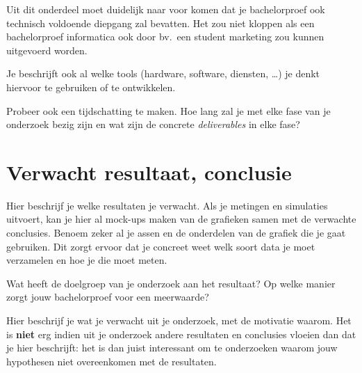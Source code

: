 Uit dit onderdeel moet duidelijk naar voor komen dat je bachelorproef ook technisch voldoen\-de diepgang zal bevatten. Het zou niet kloppen als een bachelorproef informatica ook door bv.\ een student marketing zou kunnen uitgevoerd worden.

Je beschrijft ook al welke tools (hardware, software, diensten, \ldots) je denkt hiervoor te gebruiken of te ontwikkelen.

Probeer ook een tijdschatting te maken. Hoe lang zal je met elke fase van je onderzoek bezig zijn en wat zijn de concrete \emph{deliverables} in elke fase?

\section{Verwacht resultaat, conclusie}
\label{sec:verwachte_resultaten}

Hier beschrijf je welke resultaten je verwacht. Als je metingen en simulaties uitvoert, kan je hier al mock-ups maken van de grafieken samen met de verwachte conclusies. Benoem zeker al je assen en de onderdelen van de grafiek die je gaat gebruiken. Dit zorgt ervoor dat je concreet weet welk soort data je moet verzamelen en hoe je die moet meten.

Wat heeft de doelgroep van je onderzoek aan het resultaat? Op welke manier zorgt jouw bachelorproef voor een meerwaarde?

Hier beschrijf je wat je verwacht uit je onderzoek, met de motivatie waarom. Het is \textbf{niet} erg indien uit je onderzoek andere resultaten en conclusies vloeien dan dat je hier beschrijft: het is dan juist interessant om te onderzoeken waarom jouw hypothesen niet overeenkomen met de resultaten.


